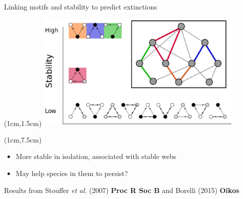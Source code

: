 \documentclass{beamer}
\begin{document}
  \begin{frame}{Linking motifs and stability to predict extinctions}
      \begin{textblock*}{10cm}(1cm,1.5cm)
        \includegraphics[width=10cm]{intro_figs/motifs_vs_stability.eps}
        \end{textblock*} 

      \begin{textblock*}{10cm}(1cm,7.5cm)
        \begin{itemize}
          \item More stable in isolation, associated with stable webs
          \item May help species in them to persist?
        \end{itemize}
        {\tiny Results from Stouffer \emph{et al.} (2007) \textbf{Proc R Soc B} and Borelli (2015) \textbf{Oikos}}
        \end{textblock*}
    \end{frame}
\end{document}
